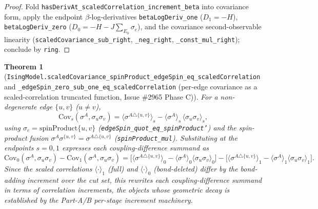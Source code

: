 \documentclass[a4paper,11pt]{article}
\newtheorem{theorem}{Theorem}
\begin{document}
\begin{proof}
Fold \texttt{hasDerivAt\_scaledCorrelation\_increment\_beta} into covariance form,
apply the endpoint $\beta$-log-derivatives \texttt{betaLogDeriv\_one}
($D_1=-H$), \texttt{betaLogDeriv\_zero} ($D_0=-H-J\sum_{E_0}\sigma_e$), and the
covariance second-observable linearity (\texttt{scaledCovariance\_sub\_right},
\texttt{\_neg\_right}, \texttt{\_const\_mul\_right}); conclude by \texttt{ring}.
\end{proof}

\begin{theorem}[\texttt{IsingModel.scaledCovariance\_spinProduct\_edgeSpin\_eq\_scaledCorrelation}
and \texttt{\_edgeSpin\_zero\_sub\_one\_eq\_scaledCorrelation} (per-edge covariance as a
scaled-correlation truncated function, Issue \#2965 Phase C)]
For a non-degenerate edge $\{u,v\}$ ($u\ne v$),
\[
  \mathrm{Cov}_s(\sigma^A,\sigma_u\sigma_v)
    = \langle\sigma^{A\triangle\{u,v\}}\rangle_s
      - \langle\sigma^A\rangle_s\,\langle\sigma_u\sigma_v\rangle_s,
\]
using $\sigma_e=\mathrm{spinProduct}\{u,v\}$
(\texttt{edgeSpin\_quot\_eq\_spinProduct'}) and the spin-product fusion
$\sigma^A\sigma^{\{u,v\}}=\sigma^{A\triangle\{u,v\}}$ (\texttt{spinProduct\_mul}).
Substituting at the endpoints $s=0,1$ expresses each coupling-difference summand as
\[
  \mathrm{Cov}_0(\sigma^A,\sigma_u\sigma_v)-\mathrm{Cov}_1(\sigma^A,\sigma_u\sigma_v)
    = \bigl[\langle\sigma^{A\triangle\{u,v\}}\rangle_0
        -\langle\sigma^A\rangle_0\langle\sigma_u\sigma_v\rangle_0\bigr]
      - \bigl[\langle\sigma^{A\triangle\{u,v\}}\rangle_1
        -\langle\sigma^A\rangle_1\langle\sigma_u\sigma_v\rangle_1\bigr].
\]
Since the scaled correlations $\langle\cdot\rangle_1$ (full) and $\langle\cdot\rangle_0$
(bond-deleted) differ by the bond-adding increment over the cut set, this rewrites each
coupling-difference summand in terms of correlation increments, the objects whose
geometric decay is established by the Part-A/B per-stage increment machinery.
\end{theorem}
\end{document}
